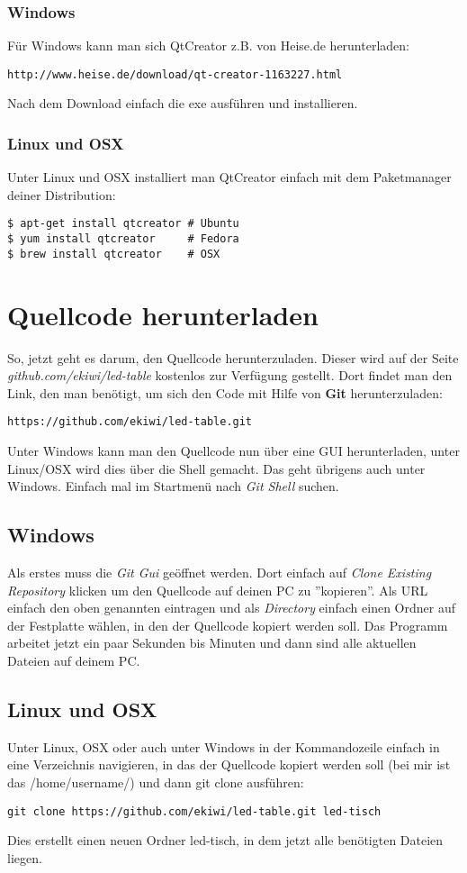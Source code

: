 \documentclass[10pt,a4paper]{article}
\begin{document}
\subsubsection{Windows}
Für Windows kann man sich QtCreator z.B. von Heise.de herunterladen:
\begin{lstlisting}
http://www.heise.de/download/qt-creator-1163227.html
\end{lstlisting}
Nach dem Download einfach die exe ausführen und installieren.

\subsubsection{Linux und OSX}
Unter Linux und OSX installiert man QtCreator einfach mit dem Paketmanager deiner Distribution:
\begin{lstlisting}
$ apt-get install qtcreator # Ubuntu
$ yum install qtcreator     # Fedora
$ brew install qtcreator    # OSX
\end{lstlisting}

\section{Quellcode herunterladen}
So, jetzt geht es darum, den Quellcode herunterzuladen. Dieser wird auf der Seite \textit{github.com/ekiwi/led-table} kostenlos zur Verfügung gestellt.
Dort findet man den Link, den man benötigt, um sich den Code mit Hilfe von \textbf{Git} herunterzuladen:
\begin{lstlisting}
https://github.com/ekiwi/led-table.git
\end{lstlisting}
Unter Windows kann man den Quellcode nun über eine GUI herunterladen, unter Linux/OSX wird dies über die Shell gemacht. Das geht übrigens auch unter Windows. Einfach mal im Startmenü nach \textit{Git Shell} suchen.

\subsection{Windows}
Als erstes muss die \textit{Git Gui} geöffnet werden. Dort einfach auf \textit{Clone Existing Repository} klicken um den Quellcode auf deinen PC zu ''kopieren''.
Als URL einfach den oben genannten eintragen und als \textit{Directory} einfach einen Ordner auf der Festplatte wählen, in den der Quellcode kopiert werden soll.
Das Programm arbeitet jetzt ein paar Sekunden bis Minuten und dann sind alle aktuellen Dateien auf deinem PC.

\subsection{Linux und OSX}
Unter Linux, OSX oder auch unter Windows in der Kommandozeile einfach in eine Verzeichnis navigieren, in das der Quellcode kopiert werden soll (bei mir ist das /home/username/) und dann git clone ausführen:
\begin{lstlisting}
git clone https://github.com/ekiwi/led-table.git led-tisch
\end{lstlisting}
Dies erstellt einen neuen Ordner led-tisch, in dem jetzt alle benötigten Dateien liegen.
\end{document}
